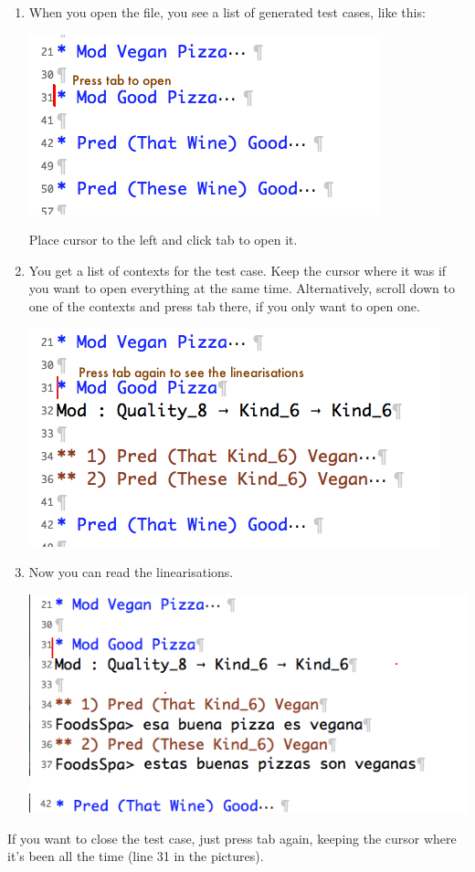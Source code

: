 \begin{enumerate}
\def\labelenumi{\arabic{enumi})}
\item
  When you open the file, you see a list of generated test cases, like
  this:

  \includegraphics[width=0.6\linewidth]{img/instruction-1.png}

  Place cursor to the left and click tab to open it.
\item
  You get a list of contexts for the test case. Keep the cursor where it
  was if you want to open everything at the same time. Alternatively,
  scroll down to one of the contexts and press tab there, if you only
  want to open one.

  \includegraphics[width=0.7\linewidth]{img/instruction-2.png}
\item

  Now you can read the linearisations.

  \includegraphics[width=0.75\linewidth]{img/instruction-3.png}
\end{enumerate}

If you want to close the test case, just press tab again, keeping the
cursor where it's been all the time (line 31 in the pictures).

